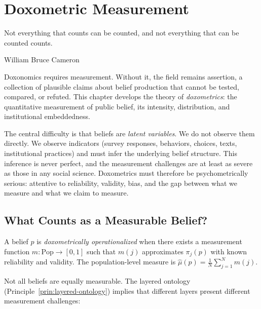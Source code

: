 \chapter{Doxometric Measurement}
\label{ch:doxometric-measurement}

\epigraph{Not everything that counts can be counted, and not everything that can be counted counts.}{William Bruce Cameron}

\noindent
Doxonomics requires measurement.
Without it, the field remains assertion, a collection of plausible claims about belief production that cannot be tested, compared, or refuted.
This chapter develops the theory of \emph{doxometrics}: the quantitative measurement of public belief, its intensity, distribution, and institutional embeddedness.

The central difficulty is that beliefs are \emph{latent variables}.
We do not observe them directly.
We observe indicators (survey responses, behaviors, choices, texts, institutional practices) and must infer the underlying belief structure.
This inference is never perfect, and the measurement challenges are at least as severe as those in any social science.
Doxometrics must therefore be psychometrically serious: attentive to reliability, validity, bias, and the gap between what we measure and what we claim to measure.


\section{What Counts as a Measurable Belief?}
\label{sec:ch13-operationalization}

\begin{definition}
\label{def:operationalized}
A belief $p$ is \emph{doxometrically operationalized} when there exists a measurement function $m: \text{Pop} \to [0,1]$ such that $m(j)$ approximates $\pi_j(p)$ with known reliability and validity.
The population-level measure is $\hat{\mu}(p) = \frac{1}{N}\sum_{j=1}^N m(j)$.
\end{definition}

Not all beliefs are equally measurable.
The layered ontology (Principle~\ref{prin:layered-ontology}) implies that different layers present different measurement challenges:

